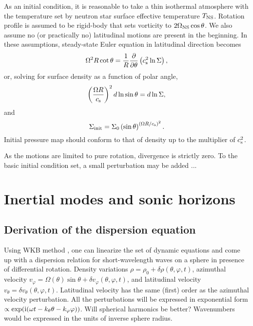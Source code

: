\documentclass[usenatbib,onecolumn]{mnras}
\newcommand{\alert}[1]{\color{red} #1\color{black}}
\newcommand{\ppardir}[2]{\ensuremath{\frac{\partial }{\partial #1} \left( #2\right)}}
\newcommand{\cs}{\ensuremath{c_{\rm s}}}
\renewcommand{\i}{\ensuremath{{\rm i}}}
\begin{document}
As an initial condition, it is reasonable to take a thin isothermal
atmosphere with the temperature set by neutron star surface effective temperature
$T_{\rm NS}$. Rotation profile is assumed to be rigid-body that sets vorticity
to $2\Omega_{\rm NS}\cos \theta$. We also assume no (or practically no)
latitudinal motions are present in the beginning.
In these assumptions, steady-state Euler equation in
latitudinal direction becomes
\begin{equation}\label{E:IC:Euler}
\Omega^2 R \cot \theta = \frac{1}{R} \ppardir{\theta}{\cs^2 \ln\Sigma},
\end{equation}
or, solving for surface density as a function of polar angle,
\begin{equation}
\left( \frac{\Omega R}{\cs}\right)^2 d\ln \sin\theta = d\ln \Sigma ,
\end{equation}
and
\begin{equation}\label{E:IC:Sigma}
\displaystyle \Sigma_{\rm init} = \Sigma_0 \left(\sin \theta \right)^{\left(\Omega R / \cs\right)^2}.
\end{equation}
Initial pressure map should conform to that of density up to the multiplier of
$\cs^2$.

As the motions are limited to pure rotation, divergence is strictly zero. To
the basic initial condition set, a small perturbation may be added ... 

\section{Inertial modes and sonic horizons}

\subsection{Derivation of the dispersion equation}

Using WKB method \citep{WKB}, one can linearize the set of dynamic equations
and come up with a dispersion relation for short-wavelength waves on a sphere
in presence of differential rotation. Density variations $\rho = \rho_0
+\delta \rho(\theta,\varphi, t)$, azimuthal velocity $v_\varphi = \Omega(\theta) \sin\theta +
\delta v_\varphi(\theta,\varphi, t)$, and latitudinal velocity $v_\theta = \delta
v_\theta(\theta,\varphi, t)$. Latitudinal velocity has the same (first) order
as the azimuthal velocity perturbation. All the perturbations will be
expressed in exponential form $\propto \exp(\i(\omega t - k_\theta \theta
- k_\varphi \varphi))$. \alert{Will spherical harmonics be better?}
Wavenumbers would be expressed in the units of inverse sphere radius. 
\end{document}
